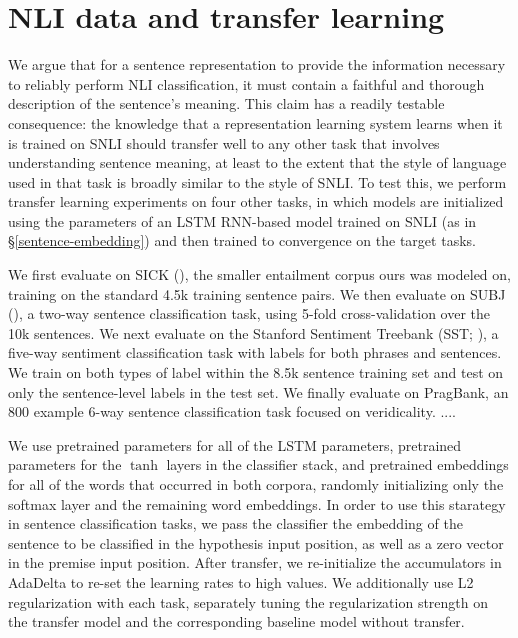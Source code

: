 \section{NLI data and transfer learning}\label{sec:transfer}

We argue that for a sentence representation to provide the information necessary to reliably perform NLI classification, it must contain a faithful and thorough description of the sentence's meaning. This claim has a readily testable consequence: the knowledge that a representation learning system learns when it is trained on SNLI should transfer well to any other task that involves understanding sentence meaning, at least to the extent that the style of language used in that task is broadly similar to the style of SNLI. To test this, we perform transfer learning \cite{pratt1991direct} experiments on four other tasks, in which models are initialized using the parameters of an LSTM RNN-based model trained on SNLI (as in \S\ref{sentence-embedding}) and then trained to convergence on the target tasks. 

We first evaluate on SICK (\citealt{marelli2014sick}), the smaller entailment corpus ours was modeled on, training on the standard 4.5k training sentence pairs. We then evaluate on SUBJ (\citealt{pang2004sentimental}), a two-way sentence classification task, using 5-fold cross-validation over the 10k sentences. We next evaluate on the Stanford Sentiment Treebank (SST; \citealt{socher2013acl1}), a five-way sentiment classification task with labels for both phrases and sentences. We train on both types of label within the 8.5k sentence training set and test on only the sentence-level labels in the test set. We finally evaluate on PragBank, an 800 example 6-way sentence classification task focused on veridicality.  ....
\noindent{}

We use pretrained parameters for all of the LSTM parameters, pretrained parameters for the $\tanh$ layers in the classifier stack, and pretrained embeddings for all of the words that occurred in both corpora, randomly initializing only the softmax layer and the remaining word embeddings. In order to use this starategy in sentence classification tasks, we pass the classifier the embedding of the sentence to be classified in the hypothesis input position, as well as a zero vector in the premise input position. After transfer, we re-initialize the accumulators in AdaDelta to re-set the learning rates to high values. We additionally use L2 regularization with each task, separately tuning the regularization strength on the transfer model and the corresponding baseline model without transfer.

